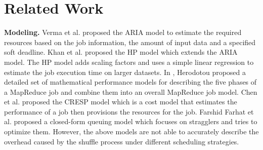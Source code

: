 \section{Related Work}\label{related}

{\color{black}
\textbf{Modeling.} 
Verma et al. \cite{verma2011aria} proposed the ARIA model to estimate the required resources based on the job information, the amount of input data and a specified soft deadline.
Khan et al. \cite{khan2016hadoop} proposed the HP model which extends the ARIA model. The HP model adds scaling factors and uses a simple linear regression to estimate the job execution time on larger datasets.
In \cite{herodotou2011hadoop}, Herodotou proposed a detailed set of mathematical performance models for describing the five phases of a MapReduce job and combine them into an overall MapReduce job model.
Chen et al. \cite{chen2014cresp} proposed the CRESP model which is a cost model that estimates the performance of a job then provisions the resources for the job.
Farshid Farhat et al.\cite{farhat2016stochastic} proposed a closed-form queuing model which focuses on stragglers and tries to optimize them. 
However, the above models are not able to accurately describe the overhead caused by the shuffle process under different scheduling strategies. 

}
